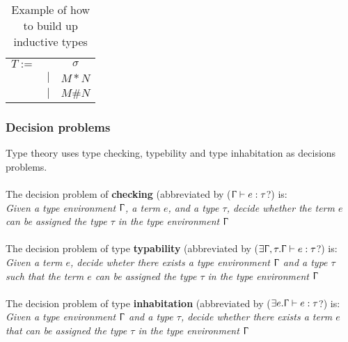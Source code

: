 \begin{table}[]
    \centering
    \begin{tabular}{c c c}
         $T :=$&  & $\sigma$\\
         & $|$ & $M * N$ \\
         & $|$ & $M \# N$ \\
    \end{tabular}
    \caption{Example of how to build up inductive types}
    \label{tab:inductive types}
\end{table}


\subsubsection{Decision problems}

Type theory uses type checking, typebility and type inhabitation as decisions problems. \\ \\
The decision problem of \textbf{checking} (abbreviated by ($\Upgamma\vdash e : \tau$?) is:\\
\textit{Given a type environment $\Upgamma$, a term $e$, and a type $\tau$, decide whether the term $e$ can be assigned the type $\tau$ in the type environment $\Upgamma$} \\ \\
The decision problem of type \textbf{typability} (abbreviated by ($ \exists \Upgamma,\tau .\Upgamma\vdash e : \tau$?) is: \\ 
\textit{Given  a term $e$, decide wheter there exists a type environment $\Upgamma$ and a type $\tau$ such that the term $e$ can be assigned the type $\tau$ in the type environment $\Upgamma$} \\ \\ 
The decision problem of type \textbf{inhabitation} (abbreviated by ($ \exists e.\Upgamma \vdash e : \tau$?) is: \\
\textit{Given a type environment $\Upgamma$ and a type $\tau$, decide whether there exists a term $e$ that can be assigned the type $\tau$ in the type environment $\Upgamma$}

